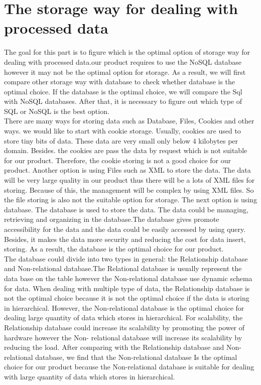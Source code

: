 \section{The storage way for dealing with processed data}
        The goal for this part is to figure which is the optimal option of storage way for dealing with  processed data.our product requires to use the NoSQL database however it may not be the optimal option for storage. As a result, we will first compare other storage way with database to check whether database is the optimal choice. If the database is the optimal choice, we will compare the Sql with NoSQL databases. After that, it is necessary to figure out which type of SQL or NoSQL is the best option.\\
    
        \noindent There are many ways for storing data such as Database, Files, Cookies and other ways. we would like to start with cookie storage. Usually, cookies are used to store tiny bits of data. These data are very small only below 4 kilobytes per domain\cite{W1}. Besides. the cookies are pass the data by request which is not suitable for our product. Therefore, the cookie storing is not a good choice for our product. Another option is using Files such as XML to store the data. The data will be very large quality in our product thus there will be a lots of XML files for storing. Because of this, the management will be complex by using XML files. So the file storing is also not the suitable option for storage. The next option is using database. The database is used to store the data. The data could be managing, retrieving and organizing in the database\cite{W2}.The database gives promote accessibility for the data and the data could be easily accessed by using query. Besides, it makes the data more security and reducing the cost for data insert, storing\cite{W3}. As a result, the database is the optimal choice for our product.\\
        
        \noindent The database could divide into two types in general: the Relationship database and Non-relational database.The Relational database is usually represent the data base on the table however the Non-relational database use dynamic schema for data. When dealing with multiple type of data, the Relationship database is not the optimal choice because it is not the optimal choice if the data is storing in hierarchical. However, the Non-relational database is the optimal choice for  dealing large quantity of data which stores in hierarchical. For scalability, the Relationship database could increase its scalability by promoting the power of hardware however the Non- relational database will increase its scalability by reducing the load. After comparing with the Relationship database and Non-relational database, we find that the Non-relational database Is the optimal choice for our product because the Non-relational database is suitable for dealing with large quantity of data which stores in hierarchical\cite{W4}.\\
	
